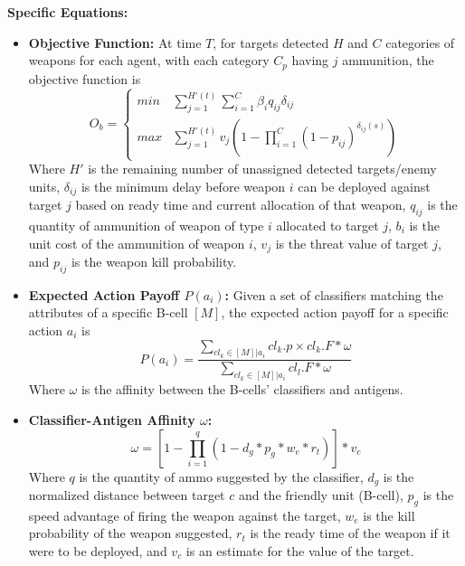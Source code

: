 \documentclass[12pt]{article} %
\begin{document}
    \textbf{Specific Equations:}
    \begin{itemize}
        \item \textbf{Objective Function:} 
        At time $T$, for targets detected $H$ and $C$ categories of weapons for each agent, with each category $C_p$ having $j$ ammunition, the objective function is
            \begin{equation}
                O_{b} = 
                \begin{cases}
                    min & \sum^{H'(t)}_{j=1} \sum^{C}_{i=1}\beta_i q_{ij} \delta_{ij} \\
                    max & \sum^{H'(t)}_{j=1} v_j (1 - \prod^{C}_{i=1} (1-p_{ij})^{\delta_{ij}(s)})
                \end{cases}
            \end{equation}
             Where $H'$ is the remaining number of unassigned detected targets/enemy units, $\delta_{ij}$ is the minimum delay before weapon $i$ can be deployed against target $j$ based on
ready time and current allocation of that weapon, $q_{ij}$ is the quantity of ammunition of weapon of type $i$ allocated to target $j$, $b_i$ is the unit cost of the ammunition of weapon $i$, $v_j$ is the threat value of target $j$, and $p_{ij}$ is the weapon kill probability.
        \item \textbf{Expected Action Payoff $P(a_i)$: } 
            Given a set of classifiers matching the attributes of a specific B-cell $[M]$, the expected action payoff for a specific action $a_i$ is
            \begin{equation}
                P(a_i) = \frac{\sum_{cl_{k} \in [M] | a_i} cl_{k}.p \times cl_k.F * \omega}{\sum_{cl_{k} \in [M] | a_i} cl_l.F * \omega}
            \end{equation}
            Where $\omega$ is the affinity between the B-cells' classifiers and antigens. 
            
        \item \textbf{Classifier-Antigen Affinity $\omega$: }
            \begin{equation}
                \omega = [1 - \prod^{q}_{i=1}(1-d_g * p_g * w_e * r_t)] * v_c
            \end{equation}
            Where $q$ is the quantity of ammo suggested by the classifier, $d_g$ is the normalized distance between target $c$ and the friendly unit (B-cell), $p_g$ is the speed advantage of firing the weapon against the target, $w_e$ is the kill probability of the weapon suggested, $r_t$ is the ready time of the weapon if it were to be deployed, and $v_c$ is an estimate for the value of the target. 


\end{itemize}
\end{document}
